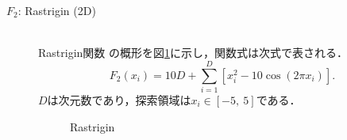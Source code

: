 \documentclass[a4j,11pt]{jarticle}
\begin{document}
\begin{description}
\item[$F_2$: Rastrigin (2D)]\mbox{}\\
Rastrigin関数 \cite{MOP} の概形を図\ref{fig:minF2}に示し，関数式は次式で表される．
\begin{equation}
\label{eq:minF2}
F_2(x_i)=10D+\sum_{i=1}^D[x_i^2-10\cos(2\pi x_i)].
\end{equation}
$D$は次元数であり，探索領域は$x_i \in [-5, \ 5]$である．
\begin{figure}[t]
\centering
{}
\caption{Rastrigin}
\label{fig:minF2}
\end{figure}


\end{description}
\end{document}

